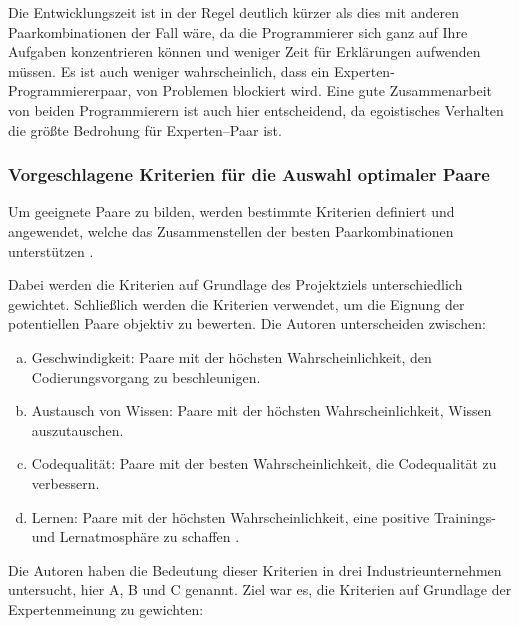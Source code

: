 Die Entwicklungszeit ist in der Regel deutlich kürzer als dies mit anderen Paarkombinationen der Fall wäre,  da die Programmierer sich ganz auf Ihre Aufgaben konzentrieren können und weniger Zeit für Erklärungen aufwenden müssen. Es ist auch weniger wahrscheinlich, dass ein Experten-Programmiererpaar, von Problemen blockiert wird. Eine gute Zusammenarbeit von beiden Programmierern ist auch hier entscheidend, da egoistisches Verhalten die größte Bedrohung für Experten–Paar ist.



\subsubsection *{Vorgeschlagene Kriterien für die Auswahl optimaler Paare} Um geeignete Paare zu bilden, werden bestimmte Kriterien definiert und angewendet, welche das Zusammenstellen der besten Paarkombinationen unterstützen \cite{Alshehri2014RankingProgramming}.

Dabei werden die Kriterien auf Grundlage des Projektziels unterschiedlich gewichtet. Schließlich werden die Kriterien verwendet, um die Eignung der potentiellen Paare objektiv zu bewerten. Die Autoren unterscheiden zwischen:

\begin{enumerate}[a.]
\item Geschwindigkeit: Paare mit der höchsten Wahrscheinlichkeit, den Codierungsvorgang zu beschleunigen.
\item Austausch von Wissen: Paare mit der höchsten Wahrscheinlichkeit, Wissen auszutauschen.
\item Codequalität: Paare mit der besten Wahrscheinlichkeit, die Codequalität zu verbessern.
\item Lernen: Paare mit der höchsten Wahrscheinlichkeit, eine positive Trainings- und Lernatmosphäre zu schaffen \cite{Alshehri2014RankingProgramming}.
\end{enumerate}

Die Autoren \cite{Alshehri2014RankingProgramming} haben die Bedeutung dieser Kriterien in drei Industrieunternehmen untersucht, hier A, B und C genannt. Ziel war es, die Kriterien auf Grundlage der Expertenmeinung zu gewichten:

